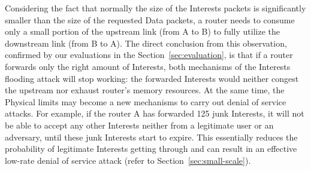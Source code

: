 Considering the fact that normally the size of the Interests packets is significantly smaller than the size of the requested Data packets, a router needs to consume only a small portion of the upstream link (from A to B) to fully utilize the downstream link (from B to A).
The direct conclusion from this observation, confirmed by our evaluations in the Section~\ref{sec:evaluation}, is that if a router forwards only the right amount of Interests, both mechanisms of the Interests flooding attack will stop working: the forwarded Interests would neither congest the upstream nor exhaust router's memory resources.
At the same time, the Physical limits may become a new mechanisms to carry out denial of service attacks.
For example, if the router A has forwarded 125 junk Interests, it will not be able to accept any other Interests neither from a legitimate user or an adversary, until these junk Interests start to expire.
This essentially reduces the probability of legitimate Interests getting through and can result in an effective low-rate denial of service attack (refer to Section~\ref{sec:small-scale}).


